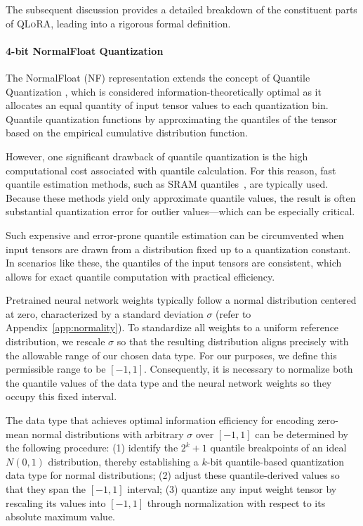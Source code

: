 The subsequent discussion provides a detailed breakdown of the constituent parts of \textsc{QLoRA}, leading into a rigorous formal definition.

\paragraph{4-bit NormalFloat Quantization} The NormalFloat (NF) representation extends the concept of Quantile Quantization \citep{dettmers2022optimizers}, which is considered information-theoretically optimal as it allocates an equal quantity of input tensor values to each quantization bin. Quantile quantization functions by approximating the quantiles of the tensor based on the empirical cumulative distribution function.

However, one significant drawback of quantile quantization is the high computational cost associated with quantile calculation. For this reason, fast quantile estimation methods, such as SRAM quantiles~\citep{dettmers2022optimizers}, are typically used. Because these methods yield only approximate quantile values, the result is often substantial quantization error for outlier values—which can be especially critical.

Such expensive and error-prone quantile estimation can be circumvented when input tensors are drawn from a distribution fixed up to a quantization constant. In scenarios like these, the quantiles of the input tensors are consistent, which allows for exact quantile computation with practical efficiency.

Pretrained neural network weights typically follow a normal distribution centered at zero, characterized by a standard deviation $\sigma$ (refer to Appendix~\ref{app:normality}). To standardize all weights to a uniform reference distribution, we rescale $\sigma$ so that the resulting distribution aligns precisely with the allowable range of our chosen data type. For our purposes, we define this permissible range to be $[-1, 1]$. Consequently, it is necessary to normalize both the quantile values of the data type and the neural network weights so they occupy this fixed interval.

The data type that achieves optimal information efficiency for encoding zero-mean normal distributions with arbitrary $\sigma$ over $[-1, 1]$ can be determined by the following procedure: (1) identify the $2^k+1$ quantile breakpoints of an ideal $N(0, 1)$ distribution, thereby establishing a $k$-bit quantile-based quantization data type for normal distributions; (2) adjust these quantile-derived values so that they span the $[-1, 1]$ interval; (3) quantize any input weight tensor by rescaling its values into $[-1, 1]$ through normalization with respect to its absolute maximum value.

